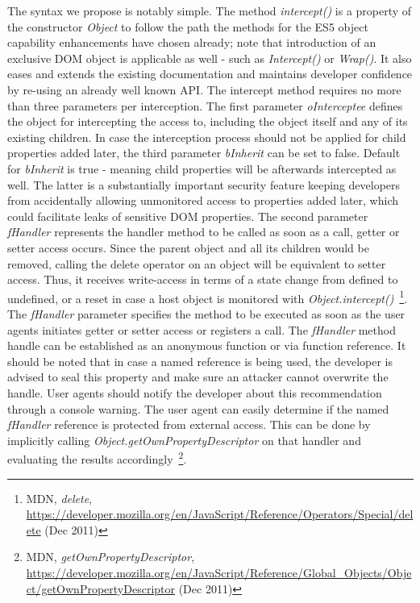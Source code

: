     The syntax we propose is notably simple. The method \textit{intercept()} is a property of the constructor \textit{Object} to follow the path the methods for the ES5 object capability enhancements have chosen already; note that introduction of an exclusive DOM object is applicable as well - such as \textit{Intercept()} or \textit{Wrap()}. It also eases and extends the existing documentation and maintains developer confidence by re-using an already well known API. The intercept method requires no more than three parameters per interception. The first parameter \textit{oInterceptee} defines the object for intercepting the access to, including the object itself and any of its existing children. In case the interception process should not be applied for child properties added later, the third parameter \textit{bInherit} can be set to false. Default for \textit{bInherit} is true - meaning child properties will be afterwards intercepted as well. The latter is a substantially important security feature keeping developers from accidentally allowing unmonitored access to properties added later, which could facilitate leaks of sensitive DOM properties. The second parameter \textit{fHandler} represents the handler method to be called as soon as a call, getter or setter access occurs. Since the parent object and all its children would be removed, calling the delete operator on an object will be equivalent to setter access. Thus, it receives write-access in terms of a state change from defined to undefined, or a reset in case a host object is monitored with \textit{Object.intercept()}~\footnote{MDN, \textit{delete}, \url{https://developer.mozilla.org/en/JavaScript/Reference/Operators/Special/delete} (Dec 2011)}. \\

    The \textit{fHandler} parameter specifies the method to be executed as soon as the user agents initiates getter or setter access or registers a call. The \textit{fHandler} method handle can be established as an anonymous function or via function reference. It should be noted that in case a named reference is being used, the developer is advised to seal this property and make sure an attacker cannot overwrite the handle. User agents should notify the developer about this recommendation through a console warning. The user agent can easily determine if the named \textit{fHandler} reference is protected from external access. This can be done by implicitly calling \textit{Object.getOwnPropertyDescriptor} on that handler and evaluating the results accordingly~\footnote{MDN, \textit{getOwnPropertyDescriptor}, \url{https://developer.mozilla.org/en/JavaScript/Reference/Global_Objects/Object/getOwnPropertyDescriptor} (Dec 2011)}.\\ 

